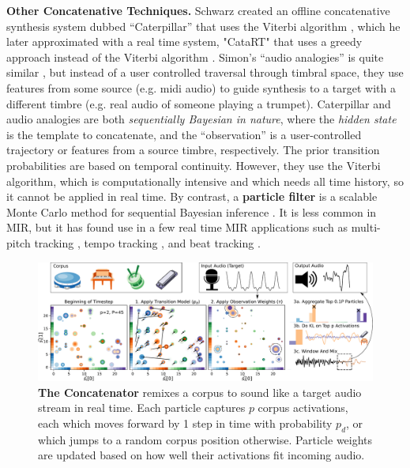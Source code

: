 \documentclass{article}
\begin{document}
\textbf{Other Concatenative Techniques.} Schwarz created an offline concatenative synthesis system dubbed ``Caterpillar'' that uses the Viterbi algorithm \cite{schwarz2000system}, which he later approximated with a real time system, "CataRT" that uses a greedy approach instead of the Viterbi algorithm \cite{schwarz2006real, schwarz2008principles}.  Simon's ``audio analogies'' is quite similar \cite{simon2005audio}, but instead of a user controlled traversal through timbral space, they use features from some source (e.g. midi audio) to guide synthesis to a target with a different timbre (e.g. real audio of someone playing a trumpet). Caterpillar and audio analogies are both {\em sequentially Bayesian in nature}, where the {\em hidden state} is the template to concatenate, and the ``observation'' is a user-controlled trajectory or features from a source timbre, respectively.  The prior transition probabilities are based on temporal continuity.  However, they use the Viterbi algorithm, which is computationally intensive and which needs all time history, so it cannot be applied in real time.  By contrast, a \textbf{particle filter} is a scalable Monte Carlo method for sequential Bayesian inference \cite{metropolis1949monte, doucet2000sequential, thrun2002probabilistic}.  It is less common in MIR, but it has found use in a few real time MIR applications such as multi-pitch tracking \cite{duan2011state}, tempo tracking \cite{cemgil2003monte, hainsworth2004particle}, and beat tracking \cite{heydari2021don}.  

\begin{figure}[h]
	\centering
	\includegraphics[width=\textwidth]{figs/BlockDGM.pdf}%
	\caption{\textbf{The Concatenator} remixes a corpus to sound like a target audio stream in real time.  Each particle captures $p$ corpus activations, each which moves forward by 1 step in time with probability $p_d$, or which jumps to a random corpus position otherwise. Particle weights are updated based on how well their activations fit incoming audio.   }
	\label{fig:BlockDGM}
\end{figure}
\end{document}

